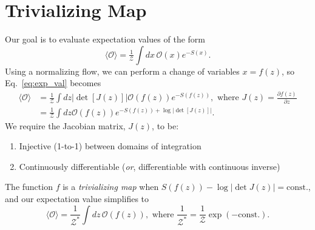 \documentclass[a4paper,11pt]{article}
\begin{document}
\section{\label{sec:trivializing_map}Trivializing Map}
%
Our goal is to evaluate expectation values of the form
%
\begin{equation}
    \label{eq:exp_val}
    \langle \mathcal{O} \rangle = \tfrac{1}{\mathcal{Z}} \int dx\, \mathcal{O} (x) e^{-S(x)}.
\end{equation}
%
Using a normalizing flow, we can perform a change of variables \(x = f(z)\), so
Eq.~\ref{eq:exp_val} becomes
%
\begin{align}
    \langle \mathcal{O} \rangle 
    &= \frac{1}{\mathcal{Z}} \int dz \left|\det \left[ J(z) \right]\right|
        \mathcal{O} (f(z)) e^{-S(f(z))},
        \text{ where } J (z) = \frac{\partial f(z)}{\partial z} \\
    &= \frac{1}{\mathcal{Z}}\int dz \mathcal{O} (f(z)) e^{-S(f(z))
        + \log |\det[J(z)]|}.
\end{align}
%
We require the Jacobian matrix, \(J(z)\), to be:
%
\begin{enumerate}
    \item Injective (1-to-1) between domains of integration
    \item Continuously differentiable (\emph{or}, differentiable with
        continuous inverse)
\end{enumerate}
%
The function \(f\) is a \emph{trivializing map} when \(S(f(z)) - \log\left|\det
J(z)\right| = \text{const.}\), and our expectation value simplifies to
%
\begin{equation}
    \langle\mathcal{O}\rangle = 
    \frac{1}{\mathcal{Z}^{\ast}}\int dz\, \mathcal{O}(f(z)), \text{ where }
    \frac{1}{\mathcal{Z}^{\ast}} 
    = \frac{1}{\mathcal{Z}}\exp(-\text{const.}).
\end{equation}
%
\end{document}
